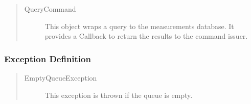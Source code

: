 \begin{quote}
	\begin{description}
		\item[QueryCommand] This object wraps a query to the measurements database. It
		provides a Callback to return the results to the command issuer.
	\end{description} 
\end{quote}

\subsubsection{Exception Definition}

\begin{quote}
	\begin{description}
		\item[EmptyQueueException] This exception is thrown if the queue is empty.
	\end{description} 
\end{quote}

